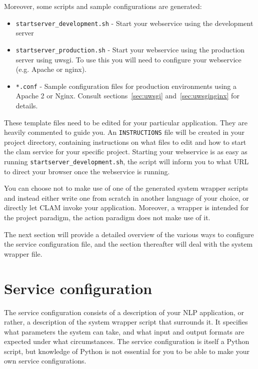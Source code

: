 \documentclass[a4paper,12pt,twoside,openright]{report}
\begin{document}
Moreover, some scripts and sample configurations are generated:

\begin{itemize}
\item \texttt{startserver\_development.sh} - Start your webservice using the development server
\item \texttt{startserver\_production.sh} - Start your webservice using the production server using uwsgi. To use this you will need to configure your webservice (e.g. Apache or nginx).
\item \texttt{*.conf} - Sample configuration files for production environments using a Apache 2 or Nginx. Consult sections~\ref{sec:uwsgi} and~\ref{sec:uwsginginx} for details.
\end{itemize}

These template files need to be edited for your particular application.  They
are heavily commented to guide you. An \texttt{INSTRUCTIONS} file will be
created in your project directory, containing instructions on what files to
edit and how to start the clam service for your specific project. Starting your
webservice is as easy as running \texttt{startserver\_development.sh}, the
script will inform you to what URL to direct your browser once the webservice is running.

You can choose not to make use of one of the generated system wrapper scripts
and instead either write one from scratch in another language of your choice,
or directly let CLAM invoke your application. Moreover, a wrapper is intended
for the project paradigm, the action paradigm does not make use of it.

The next section will provide a detailed overview of the various ways to
configure the service configuration file, and the section thereafter will deal
with the system wrapper file.

\section{Service configuration}
\label{sec:serviceconfig}

The service configuration consists of a description of your NLP application, or
rather, a description of the system wrapper script that surrounds it. It
specifies what parameters the system can take, and what input and output
formats are expected under what circumstances. The service configuration is
itself a Python script, but knowledge of Python is not essential for you to be
able to make your own service configurations. 
\end{document}
